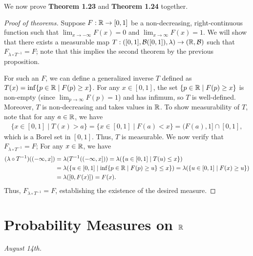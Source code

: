 We now prove \textbf{Theorem 1.23} and \textbf{Theorem 1.24} together.
\begin{proof}[Proof of theorems]
    Suppose $F:\mathbb{R} \to [0,1]$ be a non-decreasing, right-continuous function such that $\lim_{x \to -\infty} F(x) = 0$ and $\lim_{x \to \infty} F(x) = 1$. We will show that there exists a measurable map $T:([0,1],\mathcal{B}([0,1]),\lambda) \to (\mathbb{R},\mathcal{B})$ such that $F_{\lambda \circ T^{-1}} = F$; note that this implies the second theorem by the previous proposition.

    For such an $F$, we can define a generalized inverse $T$ defined as $T(x) = \inf\{p \in \mathbb{R} \mid F(p) \geq x\}$. For any $x \in [0,1]$, the set $\{p \in \mathbb{R} \mid F(p) \geq x\}$ is non-empty (since $\lim_{p \to \infty} F(p) = 1$) and has infimum, so $T$ is well-defined. Moreover, $T$ is non-decreasing and takes values in $\mathbb{R}$. To show measurability of $T$, note that for any $a \in \mathbb{R}$, we have
    \begin{align}
        \{x \in [0,1] \mid T(x) > a\} = \{x \in [0,1] \mid F(a) < x\} = (F(a), 1] \cap [0,1],
    \end{align}
    which is a Borel set in $[0,1]$. Thus, $T$ is measurable. We now verify that $F_{\lambda \circ T^{-1}} = F$; For any $x \in \mathbb{R}$, we have
    \begin{align}
        (\lambda \circ T^{-1})((-\infty, x]) 
        &= \lambda(T^{-1}((-\infty, x])) 
        = \lambda(\{u \in [0,1] \mid T(u) \leq x\}) \notag \\
        &= \lambda(\{u \in [0,1] \mid \inf\{p \in \mathbb{R} \mid F(p) \geq u\} \leq x\})
        = \lambda(\{u \in [0,1] \mid F(x) \geq u\}) \notag \\
        &= \lambda([0, F(x)])
        = F(x).
    \end{align}
    Thus, $F_{\lambda \circ T^{-1}} = F$, establishing the existence of the desired measure.
\end{proof}

\section{Probability Measures on $\mathbb{R}$}
\textit{August 14th.}

